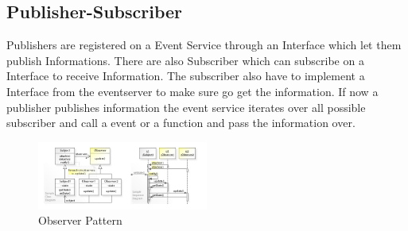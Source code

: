 \subsection{Publisher-Subscriber}
Publishers are registered on a Event Service through an Interface which let them publish Informations. There are also Subscriber which can subscribe on a Interface to receive Information. The subscriber also have to implement a Interface from the eventserver to make sure go get the information. If now a publisher publishes information the event service iterates over all possible subscriber and call a event or a function and pass the information over. 
\begin{figure}[H]
\centering
\includegraphics[width=0.5\textwidth]{figures/ObserverPrinciple.jpg}
\caption{Observer Pattern}
\end{figure}
\clearpage